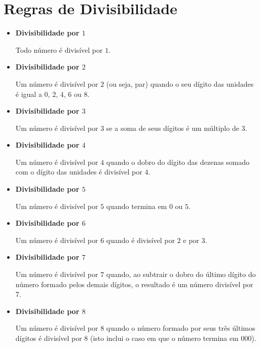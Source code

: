 
\chapter{Regras de Divisibilidade}
 \begin{itemize}
  \item \textbf{Divisibilidade por $1$}

 Todo número é divisível por $1$.

 \item \textbf{Divisibilidade por $2$}

 Um número é divisível por $2$ (ou seja, par) quando o seu dígito das unidades é igual a $0$, $2$, $4$, $6$ ou $8$.

 \item \textbf{Divisibilidade por $3$}

 Um número é divisível por $3$ se a soma de seus dígitos é um múltiplo de $3$.

 \item \textbf{Divisibilidade por $4$}

 Um número é divisível por $4$ quando o dobro do dígito das dezenas somado com o dígito das unidades é divisível por $4$.

 \item \textbf{Divisibilidade por $5$}

 Um número é divisível por $5$ quando termina em $0$ ou $5$.

 \item \textbf{Divisibilidade por $6$}

 Um número é divisível por $6$ quando é divisível por $2$ e por $3$.

 \item \textbf{Divisibilidade por $7$}

 Um número é divisível por $7$ quando, ao subtrair o dobro do último dígito do número formado pelos demais dígitos, o resultado é um número divisível por $7$.

 \item \textbf{Divisibilidade por $8$}

 Um número é divisível por $8$ quando o número formado por seus três últimos dígitos é divisível por $8$ (isto inclui o caso em que o número termina em $000$).


\end{itemize}
